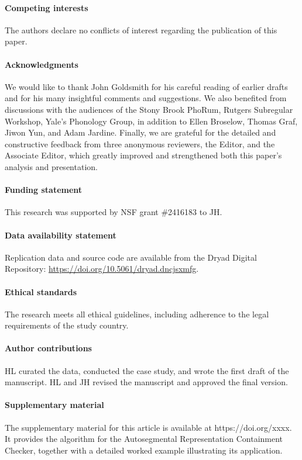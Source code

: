 \documentclass{CUP-JNL-PHO}%
\theoremstyle{definition}
\numberwithin{equation}{section}
\theoremstyle{definition}
\begin{document}
\begin{Backmatter}

\paragraph{Competing interests}

The authors declare no conflicts of interest regarding the publication of
this paper.


\paragraph{Acknowledgments}
We would like to thank John Goldsmith for his careful reading of earlier drafts and 
for his many insightful comments and suggestions. We also benefited from 
discussions with the audiences of the Stony Brook PhoRum, Rutgers Subregular 
Workshop, Yale's Phonology Group, in addition to Ellen Broselow, Thomas Graf, Jiwon 
Yun, and Adam Jardine. Finally, we are grateful for the detailed and constructive 
feedback from three anonymous reviewers, the Editor, and the Associate Editor, 
which greatly improved and strengthened both this paper's analysis and presentation.

\paragraph{Funding statement}
This research was supported by NSF grant \#2416183 to JH.

\paragraph{Data availability statement}
Replication data and source code are available from the Dryad Digital Repository: \url{https://doi.org/10.5061/dryad.dncjsxmfg}.
\paragraph{Ethical standards}
The research meets all ethical guidelines, including adherence to the legal requirements of the study country.

\paragraph{Author contributions}
HL curated the data, conducted the case study, and wrote the first 
draft of the manuscript. HL and JH revised the manuscript and 
approved the final version.

\paragraph{Supplementary material}
The supplementary material for this article is available at https://doi.org/xxxx. It provides the algorithm for the Autosegmental Representation Containment 
Checker, together with a detailed worked example illustrating its application.




\end{Backmatter} 
\end{document}
